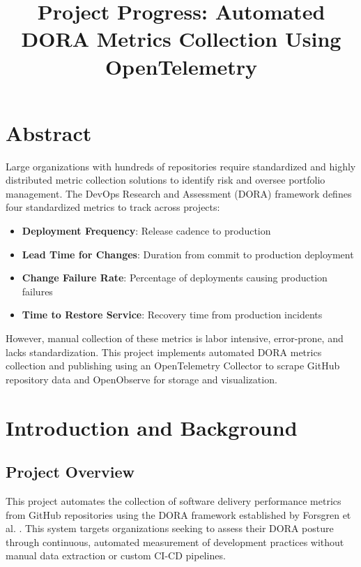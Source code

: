 \documentclass[12pt]{article}
\title{Project Progress: Automated DORA Metrics Collection Using OpenTelemetry}
\author{}
\date{}
\begin{document}
\maketitle

\section*{Abstract}

Large organizations with hundreds of repositories require standardized and highly
distributed metric collection solutions to identify risk and oversee portfolio management.
The DevOps Research and Assessment (DORA) framework defines four standardized metrics
\cite{forsgren2018accelerate, rueegger2024fully} to track across projects:

\begin{itemize}
	\item \textbf{Deployment Frequency}: Release cadence to production
	\item \textbf{Lead Time for Changes}: Duration from commit to production deployment
	\item \textbf{Change Failure Rate}: Percentage of deployments causing production failures
	\item \textbf{Time to Restore Service}: Recovery time from production incidents
\end{itemize}

However, manual collection of these metrics is labor intensive, error-prone, and lacks standardization.
This project implements automated DORA metrics collection and publishing using an OpenTelemetry Collector
to scrape GitHub repository data and OpenObserve for storage and visualization.

\section{Introduction and Background}

\subsection{Project Overview}

This project automates the collection of software delivery performance metrics
from GitHub repositories using the DORA framework established by Forsgren et al.
\cite{forsgren2018accelerate}.
This system targets organizations seeking to assess their DORA posture through continuous, automated
measurement of development practices without manual data extraction or custom CI-CD pipelines.
\end{document}
